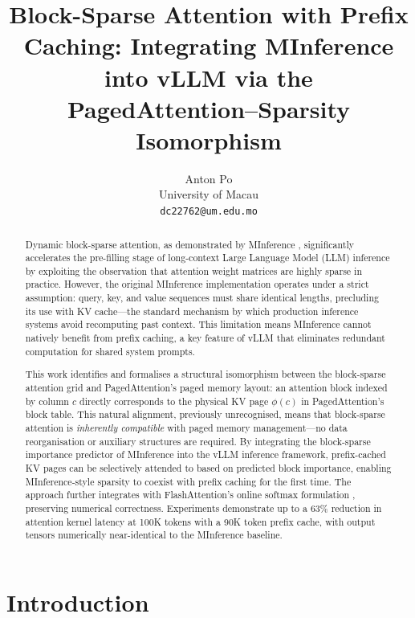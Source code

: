 \documentclass{article}
\title{Block-Sparse Attention with Prefix Caching: Integrating
       MInference into vLLM via the PagedAttention--Sparsity Isomorphism}
\author{
  Anton Po \\
  University of Macau \\
  \texttt{dc22762@um.edu.mo} \\
}
\begin{document}
\maketitle

\begin{abstract}
Dynamic block-sparse attention, as demonstrated by MInference
\cite{minference}, significantly accelerates the pre-filling stage of
long-context Large Language Model (LLM) inference by exploiting the
observation that attention weight matrices are highly sparse in practice.
However, the original MInference implementation operates under a strict
assumption: query, key, and value sequences must share identical lengths,
precluding its use with KV cache---the standard mechanism by which
production inference systems avoid recomputing past context. This
limitation means MInference cannot natively benefit from prefix caching,
a key feature of vLLM \cite{pagedattention} that eliminates redundant
computation for shared system prompts.

This work identifies and formalises a structural isomorphism between the
block-sparse attention grid and PagedAttention's paged memory layout: an
attention block indexed by column $c$ directly corresponds to the physical
KV page $\phi(c)$ in PagedAttention's block table. This natural alignment,
previously unrecognised, means that block-sparse attention is
\textit{inherently compatible} with paged memory management---no data
reorganisation or auxiliary structures are required. By integrating the
block-sparse importance predictor of MInference into the vLLM inference
framework, prefix-cached KV pages can be selectively attended to based on
predicted block importance, enabling MInference-style sparsity to
coexist with prefix caching for the first time. The approach further
integrates with FlashAttention's online softmax formulation
\cite{flashattention2}, preserving numerical correctness. Experiments
demonstrate up to a 63\% reduction in attention kernel latency at 100K
tokens with a 90K token prefix cache, with output tensors numerically
near-identical to the MInference baseline.
\end{abstract}

\section{Introduction}
\label{sec:intro}
\end{document}

